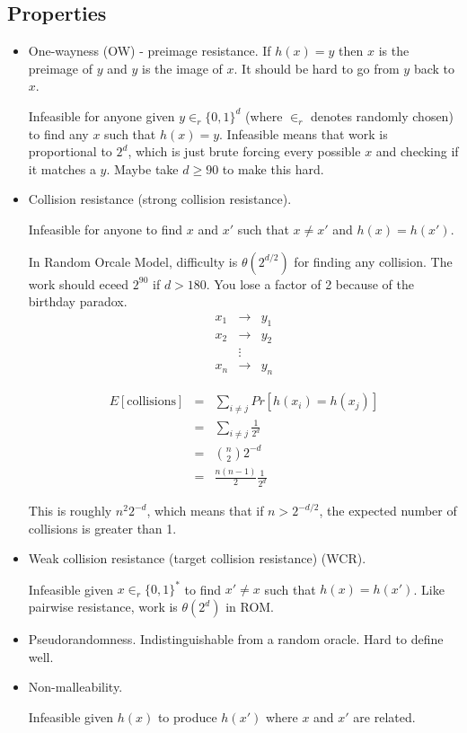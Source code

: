 \documentclass[psamsfonts]{amsart}
\begin{document}
\subsection{Properties}

\begin{itemize}
\item One-wayness (OW) - preimage resistance. If $h(x) = y$ then $x$ is the preimage of $y$ and $y$ is the image of $x$. It should be hard to go from $y$ back to $x$. 

Infeasible for anyone given $y \in_{r} \{0, 1\}^d$ (where $\in_r$ denotes randomly chosen) to find any $x$ such that $h(x) = y$. Infeasible means that work is proportional to $2^d$, which is just brute forcing every possible $x$ and checking if it matches a $y$. Maybe take $d \geq 90$ to make this hard. 

\item Collision resistance (strong collision resistance).

Infeasible for anyone to find $x$ and $x'$ such that $x \neq x'$ and $h(x) = h(x')$. 

In Random Orcale Model, difficulty is $\theta(2^{d/2})$ for finding any collision. The work should eceed $2^90$ if $d > 180$. You lose a factor of 2 because of the birthday paradox.  
\begin{eqnarray}
x_1 &\to& y_1 \\
x_2 &\to& y_2 \\
&\vdots& \\
x_n &\to& y_n
\end{eqnarray}

\begin{eqnarray}
E[\textrm{collisions}] &=& \sum_{i \neq j} Pr[h(x_i) = h(x_j)] \\
&=& \sum_{i \neq j} \frac{1}{2^d} \\
&=& { {n \choose 2 } }  2^{-d} \\
&=& \frac{n (n-1)}{2} \frac{1}{2^{d}} 
\end{eqnarray}

This is roughly $n^2 2^{-d}$, which means that if $n > 2^{-d/2}$, the expected number of collisions is greater than 1.

\item Weak collision resistance (target collision resistance) (WCR).

Infeasible given $x \in_r \{0, 1\}^*$ to find $x' \neq x$ such that $h(x) = h(x')$. Like pairwise resistance, work is $\theta(2^d)$ in ROM. 

\item Pseudorandomness. Indistinguishable from a random oracle. Hard to define well. 

\item Non-malleability. 

Infeasible given $h(x)$ to produce $h(x')$ where $x$ and $x'$ are related. 
\end{itemize}
\end{document}
